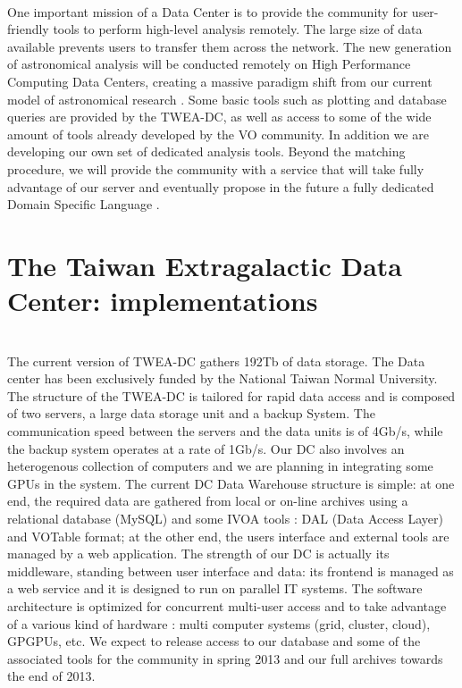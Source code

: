 \documentclass[11pt,twoside]{article}
\begin{document}
\\
One important mission of a Data Center is to provide the community for user-friendly tools to perform high-level analysis remotely. The large size of data available prevents users to transfer them across the network. The new generation of astronomical analysis will be conducted remotely on High Performance Computing Data Centers, creating a massive paradigm shift from our current model of astronomical research \citep[the {\it Fourth Paradigm} -][]{fourthpar}.
Some basic tools such as plotting and database queries are provided by the TWEA-DC, as well as access to some of the wide amount of tools already developed by the VO community. In addition we are developing our own set of dedicated analysis tools. Beyond the matching procedure, we will provide the community with a service that will take fully advantage of our server and eventually propose in the future a fully dedicated Domain Specific Language \citep{O18_adassxxii}.

\section{The Taiwan Extragalactic Data Center: implementations}

\\
The current version of TWEA-DC gathers 192Tb of data storage. The Data center has been exclusively funded by the National Taiwan Normal University.  The structure of the TWEA-DC is tailored for rapid data access and is composed of two servers, a large data storage unit and a backup System. The communication speed between the servers and the data units is of 4Gb/s, while the backup system operates at a rate of 1Gb/s. Our DC also involves an heterogenous collection of computers and we are planning in integrating some GPUs in the system. The current DC Data Warehouse structure is simple: at one end, the required data are gathered from local or on-line archives using a relational database (MySQL) and some IVOA tools : DAL (Data Access Layer) and VOTable format; at the other end, the users interface and external tools are managed by a web application. The strength of our DC is actually its middleware, standing between user interface and data: its frontend is managed as a web service and it is designed to run on parallel IT systems. The software architecture is optimized for concurrent multi-user access and to take advantage of a various kind of hardware : multi computer systems (grid, cluster, cloud), GPGPUs, etc.
We expect to release access to our database and some of the associated tools for the community in spring 2013 and our full archives towards the end of 2013.\\
\end{document}
